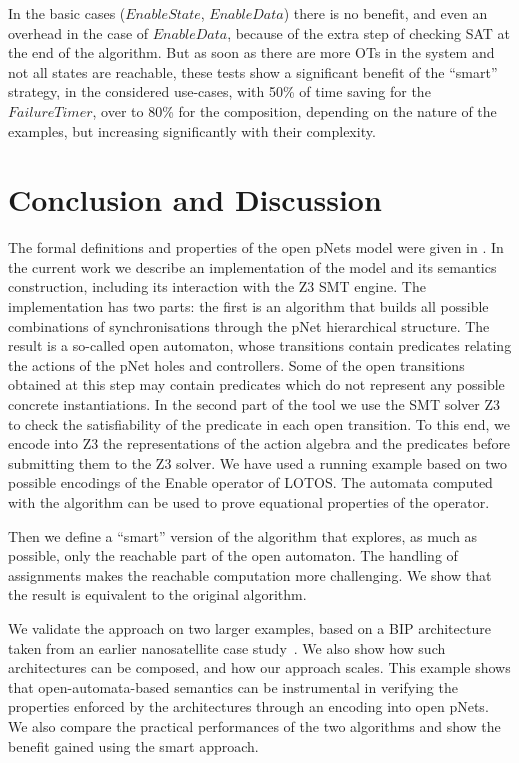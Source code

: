 \documentclass[smallcondensed]{svjour3}
\begin{document}
        \medskip
        In the basic cases ($EnableState$, $EnableData$) there is no
        benefit, and even an overhead in the case of $EnableData$,
        because of the extra step of checking SAT at the end of the
        algorithm.
But as soon as there are more OTs in the system and not all
states are reachable, these tests show a significant benefit of the ``smart'' strategy, in
the considered use-cases, with 50\% of time saving for the $FailureTimer$,
over to 80\% for the composition, depending
        on the nature of the examples, but increasing significantly
        with their complexity.

\section{Conclusion and Discussion}
\label{section:conclusion}

The formal definitions and properties of the open pNets model were
given in \cite{henrio:Forte2016}. In the current work we describe an implementation of
the model and its semantics construction, including its interaction
with the Z3 SMT engine.
The implementation has two parts: the first is an algorithm
that builds all possible combinations of synchronisations through the
pNet hierarchical structure. The result is a so-called
open automaton, whose transitions contain predicates relating
the actions of the pNet holes and controllers. Some of the open
transitions obtained at this step  may
contain predicates which do not represent any possible concrete
instantiations. 
In the second part of the tool we use the SMT solver Z3 to check the
satisfiability of the predicate in each open transition. 
To this end, we encode into Z3 the representations of the action algebra and
the predicates before submitting them to the
Z3 solver. 
%
%
We have used a running example based on two possible
encodings of the Enable operator of LOTOS. The automata computed with
the algorithm can be used to prove equational properties of the
operator.

Then we define a ``smart'' version of the algorithm that explores, as
much as possible, only the reachable part of the open automaton. The
handling of assignments makes the reachable computation more
challenging. We show that the result is equivalent to the original
algorithm. 

We validate the approach on two larger examples, 
based on a BIP architecture taken from an earlier nanosatellite case
study~\cite{CubETH-case-study}. We also show how such architectures
can be composed, and how our approach scales.
This example shows that
open-automata-based semantics can be instrumental in verifying the
properties enforced by the architectures through an encoding into open
pNets.
We also compare the practical performances of the two algorithms and
show the benefit gained using the smart approach.
\end{document}
